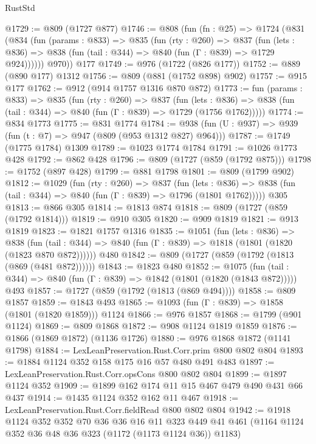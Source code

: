 \begin{lexlean}{RustStd}
\begin{coremodule}
@1729 := @809 (@1727 @877)
@1746 := @808
    (fun (fn : @25) =>
    @1724
      (@831
        (@834
          (fun (params : @833) =>
          @835
            (fun (rty : @260) =>
            @837
              (fun (lets : @836) =>
              @838 (fun (tail : @344) => @840 (fun (Γ : @839) => @1729 @924))))))
        @970))
    @177
@1749 := @976 (@1722 (@826 @177))
@1752 := @889 (@890 @177) @1312
@1756 := @809 (@881 (@1752 @898) @902)
@1757 := @915 @177
@1762 := @912 (@914 @1757 @1316 @870 @872)
@1773 := fun (params : @833) =>
  @835
    (fun (rty : @260) =>
    @837
      (fun (lets : @836) =>
      @838 (fun (tail : @344) => @840 (fun (Γ : @839) => @1729 (@1756 @1762)))))
@1774 := @834 @1773
@1775 := @831 @1774
@1784 := @938 (fun (U : @937) => @939 (fun (t : @7) => @947 (@809 (@953 @1312 @827) @964)))
@1787 := @1749 (@1775 @1784) @1309
@1789 := @1023 @1774 @1784
@1791 := @1026 @1773 @428
@1792 := @862 @428
@1796 := @809 (@1727 (@859 (@1792 @875)))
@1798 := @1752 (@897 @428)
@1799 := @881 @1798
@1801 := @809 (@1799 @902)
@1812 := @1029
    (fun (rty : @260) =>
    @837
      (fun (lets : @836) =>
      @838 (fun (tail : @344) => @840 (fun (Γ : @839) => @1796 (@1801 @1762)))))
    @305
@1813 := @866 @305
@1814 := @1813 @874
@1818 := @809 (@1727 (@859 (@1792 @1814)))
@1819 := @910 @305
@1820 := @909 @1819
@1821 := @913 @1819
@1823 := @1821 @1757 @1316
@1835 := @1051
    (fun (lets : @836) =>
    @838 (fun (tail : @344) => @840 (fun (Γ : @839) => @1818 (@1801 (@1820 (@1823 @870 @872))))))
    @480
@1842 := @809 (@1727 (@859 (@1792 (@1813 (@869 (@481 @872))))))
@1843 := @1823 @480
@1852 := @1075
    (fun (tail : @344) => @840 (fun (Γ : @839) => @1842 (@1801 (@1820 (@1843 @872)))))
    @493
@1857 := @1727 (@859 (@1792 (@1813 (@869 @494))))
@1858 := @809 @1857
@1859 := @1843 @493
@1865 := @1093 (fun (Γ : @839) => @1858 (@1801 (@1820 @1859))) @1124
@1866 := @976 @1857
@1868 := @1799 (@901 @1124)
@1869 := @809 @1868
@1872 := @908 @1124 @1819 @1859
@1876 := @1866 (@1869 @1872) (@1136 @1726)
@1880 := @976 @1868 @1872 (@1141 @1798)
@1884 := LexLeanPreservation.Rust.Corr.prim @800 @802 @804
@1893 := @1884 @1124 @352 @158 @175 @16 @57 @480 @491 @483
@1897 := LexLeanPreservation.Rust.Corr.opsCons @800 @802 @804
@1899 := @1897 @1124 @352
@1909 := @1899 @162 @174 @11 @15 @467 @479 @490 @431 @66 @437
@1914 := @1435 @1124 @352 @162 @11 @467
@1918 := LexLeanPreservation.Rust.Corr.fieldRead @800 @802 @804
@1942 := @1918
    @1124
    @352
    @352
    @70
    @36
    @36
    @16
    @11
    @323
    @449
    @41
    @461
    (@1164 @1124 @352 @36 @48 @36 @323 (@1172 (@1173 @1124 @36)) @1183)

\end{coremodule}
\end{lexlean}
